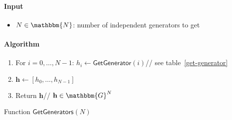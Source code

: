 \documentclass[a4paper]{article}
\newcommand{\G}{\mathbbm{G}}
\newcommand{\N}{\mathbbm{N}}
\begin{document}
\begin{table}
  \begin{framed}
    \noindent\paragraph{Input}
    \begin{itemize}
    \item $N\in\N$: number of independent generators to get
    \end{itemize}
    \noindent\paragraph{Algorithm}
    \begin{enumerate}
    \item For $i=0,\dots,N-1$:
      $h_i\leftarrow\textsf{GetGenerator}(i)$\hfill// see
      table~\ref{get-generator}
    \item $\textbf{h}\leftarrow[h_0,\dots,h_{N-1}]$
    \item Return $\textbf{h}$\hfill// $\textbf{h}\in\G^N$
    \end{enumerate}
  \end{framed}
  \caption{Function $\mathsf{GetGenerators}(N)$}
  \label{get-generators}
\end{table}
\end{document}
